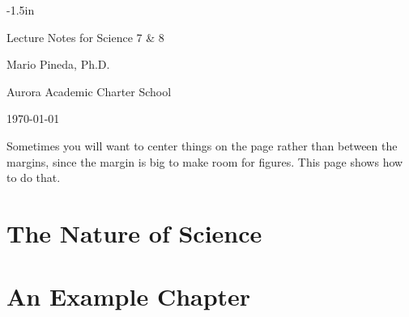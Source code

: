 \documentclass{textbook}
\begin{document}
\frontmatter

\thispagestyle{empty}
\begin{adjustwidth}{}{-1.5in}

 \centering
 \vspace{1in}
 \Huge Lecture Notes for Science 7 \& 8
 \normalsize
 \vspace{1in}

 Mario Pineda, Ph.D.
 
 Aurora Academic Charter School

 \vspace{1in}

\today

\vspace{1in}

Sometimes you will want to center things on the page rather than between the margins, since the margin is big to make room for figures. This page shows how to do that.

\end{adjustwidth}

\cleardoublepage

\tableofcontents

\mainmatter

\chapter{The Nature of Science}

\chapter{An Example Chapter}
\end{document}
